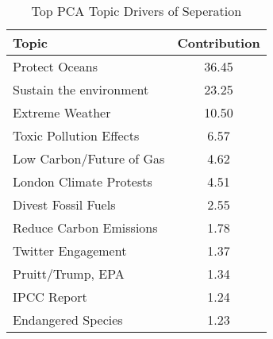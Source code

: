 \begin{table}[ht]
\centering
\caption{Top PCA Topic Drivers of Seperation} 
\label{tab:TopicContribs}
\begin{tabular}{Lc}
  \hline
Topic & Contribution \\ 
  \hline
Protect Oceans & 36.45 \\ 
  Sustain the environment & 23.25 \\ 
  Extreme Weather & 10.50 \\ 
  Toxic Pollution Effects & 6.57 \\ 
  Low Carbon/Future of Gas & 4.62 \\ 
  London Climate Protests & 4.51 \\ 
  Divest Fossil Fuels & 2.55 \\ 
  Reduce Carbon Emissions & 1.78 \\ 
  Twitter Engagement & 1.37 \\ 
  Pruitt/Trump, EPA & 1.34 \\ 
  IPCC Report & 1.24 \\ 
  Endangered Species & 1.23 \\ 
   \hline
\end{tabular}
\end{table}
